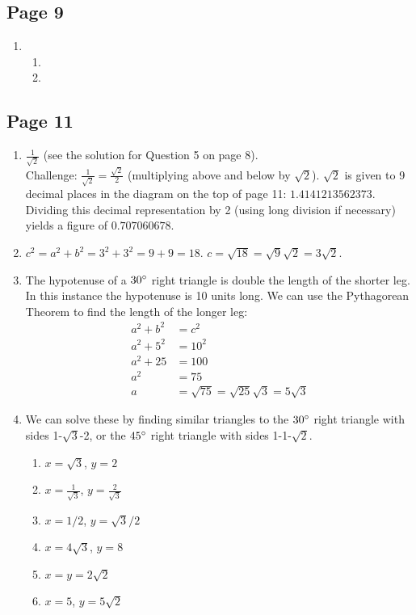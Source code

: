 \documentclass{article}
\newenvironment{solutions}[1]
{\subsection*{#1}
 \begin{enumerate}[leftmargin=1.5em]}
{\end{enumerate}}
\newcommand{\solution}{\item}
\newenvironment{subsolutions}
{\begin{enumerate}}
{\end{enumerate}}
\newcommand{\subsolution}{\item}
\begin{document}
\begin{solutions}{Page 9}
\solution %
\begin{subsolutions}
\subsolution
\subsolution


\end{subsolutions}

\end{solutions}

\begin{solutions}{Page 11}
\solution %
$\frac{1}{\sqrt{2}}$ (see the solution for Question 5 on page 8).\\
\noindent Challenge: $\frac{1}{\sqrt{2}} = \frac{\sqrt{2}}{2}$ (multiplying above and below by $\sqrt{2}$).  $\sqrt{2}$ is given to 9 decimal places in the diagram on the top of page 11: $1.4141213562373$. Dividing this decimal representation by 2 (using long division if necessary) yields a figure of $0.707060678$.
 
\solution %
$c^2 = a^2 + b^2 = 3^2 + 3^2 = 9 + 9 = 18$. $c = \sqrt{18} = \sqrt{9}\sqrt{2} = 3\sqrt{2}$.

\solution %
The hypotenuse of a $30\degree$ right triangle is double the length of the shorter leg. In this instance the hypotenuse is 10 units long. We can use the Pythagorean Theorem to find the length of the longer leg:
\begin{align*}
a^2 + b^2 &= c^2\\
a^2 + 5^2 &= 10^2\\
a^2 + 25 &= 100\\
a^2 &= 75\\
a &= \sqrt{75} = \sqrt{25}\sqrt{3} = 5\sqrt{3}
\end{align*}

\solution %
We can solve these by finding  similar triangles to the $30\degree$ right triangle with sides 1-$\sqrt{3}$-2, or the $45\degree$ right triangle with sides 1-1-$\sqrt{2}$.
\begin{subsolutions}
\subsolution $x=\sqrt{3}$, $y=2$
\subsolution $x=\frac{1}{\sqrt{3}}$, $y=\frac{2}{\sqrt{3}}$
\subsolution $x=1/2$, $y=\sqrt{3}/2$
\subsolution $x=4\sqrt{3}$, $y=8$
\subsolution $x = y = 2\sqrt{2}$
\subsolution $x=5$, $y=5\sqrt{2}$
\end{subsolutions}
\end{solutions}
\end{document}
